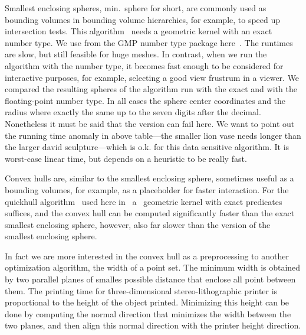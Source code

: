 Smallest enclosing spheres, min.~sphere for short, are commonly used
as bounding volumes in bounding volume hierarchies, for example, to
speed up intersection tests. This algorithm~\cite{minsphere} needs a
geometric kernel with an exact number type. We use  from
the GMP number type package here~\cite{cgal:g-gmpal-96}. The runtimes
are slow, but still feasible for huge meshes. In contrast, when we run
the algorithm with the  number type, it becomes fast
enough to be considered for interactive purposes, for example,
selecting a good view frustrum in a viewer. We compared the resulting
spheres of the algorithm run with the exact and with the floating-point number
type. In all cases the sphere center coordinates and the radius
where exactly the same up to the seven digits after the
decimal. Nonetheless it must be said that the  version
can fail here. We want to point out the running time anomaly in above
table---the smaller lion vase needs longer than the larger david
sculpture---which is o.k. for this data sensitive algorithm. It is
worst-case linear time, but depends on a heuristic to be really fast.




Convex hulls are, similar to the smallest enclosing sphere, sometimes
useful as a bounding volumes, for example, as a placeholder for faster
interaction. For the quickhull algorithm~\cite{bdh-qach-96} used here
in \cgal\ a \cgal\ geometric kernel with exact predicates suffices,
and the convex hull can be computed significantly faster than the
exact smallest enclosing sphere, however, also far slower than the
 version of the smallest enclosing sphere.

In fact we are more interested in the convex hull as a preprocessing
to another optimization algorithm, the width of a point set. The
minimum width is obtained by two parallel planes of smalles possible
distance that enclose all point between them. The printing time for
three-dimensional stereo-lithographic printer is proportional to the
height of the object printed. Minimizing this height can be done by
computing the normal direction that minimizes the width between the
two planes, and then align this normal direction with the printer
height direction.

